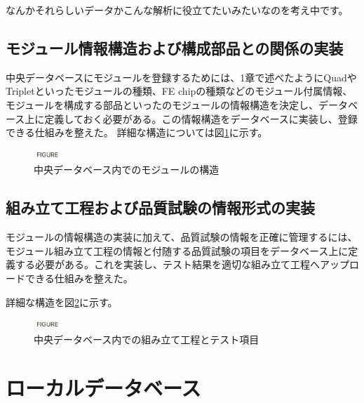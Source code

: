 なんかそれらしいデータかこんな解析に役立てたいみたいなのを考え中です。

\subsection{モジュール情報構造および構成部品との関係の実装}
中央データベースにモジュールを登録するためには、1章で述べたようにQuadやTripletといったモジュールの種類、FE chipの種類などのモジュール付属情報、モジュールを構成する部品といったのモジュールの情報構造を決定し、データベース上に定義しておく必要がある。この情報構造をデータベースに実装し、登録できる仕組みを整えた。
詳細な構造については図\ref{pd_module_structure}に示す。

\begin{figure}[bpt]\centering
\includegraphics[width=1cm]{figure}
\caption[中央データベース内でのモジュールの構造]{中央データベース内でのモジュールの構造}
\label{pd_module_structure}
\end{figure}

\subsection{組み立て工程および品質試験の情報形式の実装}
モジュールの情報構造の実装に加えて、品質試験の情報を正確に管理するには、モジュール組み立て工程の情報と付随する品質試験の項目をデータベース上に定義する必要がある。これを実装し、テスト結果を適切な組み立て工程へアップロードできる仕組みを整えた。

詳細な構造を図\ref{pd_stage_structure}に示す。

\begin{figure}[bpt]\centering
\includegraphics[width=1cm]{figure}
\caption[中央データベース内での組み立て工程とテスト項目]{中央データベース内での組み立て工程とテスト項目}
\label{pd_stage_structure}
\end{figure}

\section{ローカルデータベース}
